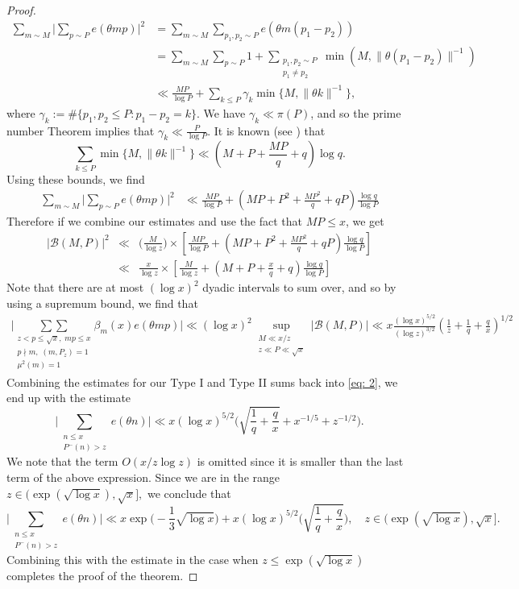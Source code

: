 \documentclass[12pt]{amsart}
\renewcommand{\leq}{\leqslant}
\numberwithin{equation}{section}
\theoremstyle{plain}
\theoremstyle{definition}
\newcommand{\CB}{\mathcal{B}}
\begin{document}
\begin{proof}
		\begin{align*}
			\sum_{m \sim M}\bigg|\sum_{p \sim P}e(\theta m p)\bigg|^2 &=  \sum_{m \sim M}\sum_{p_1,p_2 \sim P}e(\theta m(p_1-p_2))\\
			&= \sum_{m \sim M}\sum_{p \sim P}1 + \sum_{\substack{p_1,p_2 \sim P \\ p_1 \ne p_2}} \min(M,\|\theta(p_1-p_2)\|^{-1})\\
			&\ll \frac{MP}{\log P} + \sum_{k \leq P}\gamma_{k} \min\{M,\|\theta k\|^{-1}\},
		\end{align*}
		where $\gamma_{k} := \#\{p_1,p_2 \leq P: p_1-p_2=k\}.$ We have $\gamma_k \ll \pi(P)$, and so the prime number Theorem implies that $\gamma_k \ll \frac{P}{\log{ P}}.$ It is known (see \cite[p. 346]{iwaniec}) that
		$$\sum_{k \leq P}\min\{M, \|\theta k\|^{-1}\} \ll \left(M+P+\frac{MP}{q}+q\right)\log q.$$
		Using these bounds, we find
		\begin{align*}
			\sum_{m \sim M}\bigg|\sum_{p \sim P}e(\theta m p)\bigg|^2 &\ll \frac{MP }{\log P} + \left(MP+P^2+\frac{MP^2}{q}+qP\right)\frac{\log q }{\log P}
		\end{align*}
		Therefore if we combine our estimates and use the fact that $MP \leq x$, we get
		\begin{eqnarray*}|\CB(M,P)|^2 &\ll& \bigg(\frac{M}{\log z}\bigg)\times\left[\frac{MP }{\log P} +  \left(MP+P^2+\frac{MP^2}{q}+qP\right)\frac{\log q }{\log P}\right]  \\
			&\ll& \frac{x}{\log z} \times \left[\frac{M}{\log z}+\left(M+P+\frac{x}{q}+q\right)\frac{\log q}{\log P}\right]  
		\end{eqnarray*}
		Note that there are at most $(\log x)^2$ dyadic intervals to sum over, and so by using a supremum bound, we find that
		\begin{align*}
			\bigg| \underset{ \substack{z< p \leq \sqrt{x},\;mp\leq x \\ p \nmid m,\; (m,P_z) = 1 \\ \mu^2(m) = 1}}{\sum \sum}\beta_m(x)e(\theta mp) \bigg| \ll (\log x)^2 \sup_{\substack{M \ll x/z \\ z \ll P \ll \sqrt{x}}}|\CB(M,P)|  \ll x\frac{(\log x)^{5/2}}{(\log z)^{3/2}}\left(\frac{1}{z}+\frac{1}{q}+\frac{q}{x}\right)^{1/2}
		\end{align*}
		Combining the estimates for our Type I and Type II sums back into \eqref{eq: 2}, we end up with the estimate
		$$\bigg|\sum_{\substack{n \leq x \\ P^-(n) > z}} e(\theta n) \bigg| \ll x(\log x)^{5/2} \bigg( \sqrt{\frac{1}{q} + \frac{q}{x}} + x^{-1/5}+z^{-1/2}\bigg).$$
		We note that the term $O(x/z\log z)$ is omitted since it is smaller than the last term of the above expression. Since we are in the range $z \in (\exp(\sqrt{\log x}), \sqrt{x}],$ we conclude that 
		$$\bigg|\sum_{\substack{n \leq x \\ P^-(n) > z}} e(\theta n) \bigg| \ll x\exp \bigg( - \frac{1}{3} \sqrt{\log x} \bigg) + x(\log x)^{5/2} \bigg( \sqrt{\frac{1}{q} + \frac{q}{x}} \bigg), \quad z \in (\exp(\sqrt{\log x}), \sqrt{x}].$$
		Combining this with the estimate in the case when $z \leq \exp(\sqrt{\log x})$ completes the proof of the theorem.
	\end{proof}
	
\end{document}
